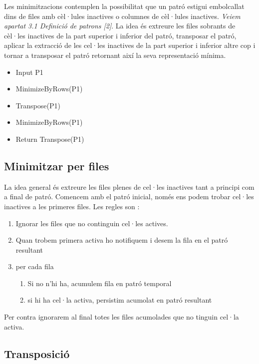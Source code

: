 \documentclass[12pt,a4paper]{report}
\begin{document}
Les minimitzacions contemplen la possibilitat que un patró estigui embolcallat dins de files amb cèl·lules inactives o columnes de cèl·lules inactives. \textit{Veiem apartat 3.1 Definició de patrons [2]}. La idea és extreure les files sobrants de cèl·les inactives de la part superior i inferior del patró, transposar el patró, aplicar la extracció de les cel·les inactives de la part superior i inferior altre cop i tornar a transposar el patró retornant així la seva representació mínima. 

\begin{itemize}
\item Input P1
\item MinimizeByRows(P1)
\item Transpose(P1)
\item MinimizeByRows(P1)
\item Return Transpose(P1)

\end{itemize}

\subsection{Minimitzar per files}

La idea general és extreure les files plenes de cel·les inactives tant a principi com a final de patró. Comencem amb el patró inicial, només ens podem trobar cel·les inactives a les primeres files. Les regles son : 

\begin{enumerate}
\item Ignorar les files que no continguin cel·les actives. 
\item Quan trobem primera activa ho notifiquem i desem la fila en el patró resultant
\item per cada fila 
	\begin{enumerate}
		\item Si no n’hi ha, acumulem fila en patró temporal
		\item si hi ha cel·la activa, persistim acumolat en patró resultant
	\end{enumerate}
\end{enumerate}

Per contra ignorarem al final totes les files acumolades que no tinguin cel·la activa. 

\subsection{Transposició}
\end{document}
